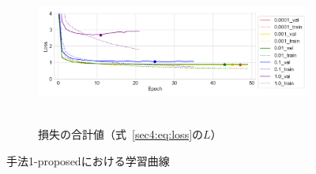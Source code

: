 \documentclass[12pt]{jarticle}
\numberwithin{equation}{section}    %
\numberwithin{figure}{section}      %
\numberwithin{table}{section}      %
\begin{document}
\begin{figure}[bt]
\begin{subfigure}{\linewidth}
        \label{sec4:fig:learning_curve_method_1_proposed_val_ssl_conv_feature_loss}
    \end{subfigure}
    \begin{subfigure}{\linewidth}
        \centering
        \includegraphics[height=48mm]{./figure/sec4/learning_curves/1/total_loss.png}
        \caption{損失の合計値（式~\eqref{sec4:eq:loss}の$L$）}
        \label{sec4:fig:learning_curve_method_1_proposed_val_total_loss}
    \end{subfigure}
    \caption{手法1-proposedにおける学習曲線}
    \label{sec4:fig:learning_curve_method_1_proposed_val_losses}
\end{figure}
\end{document}

